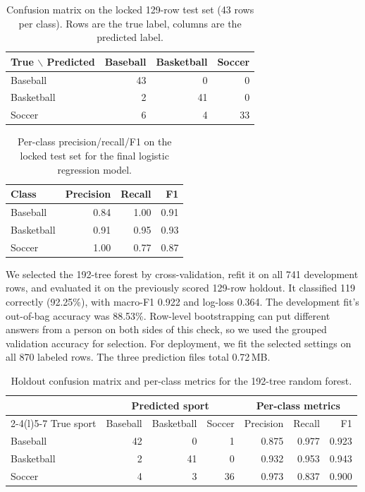 \documentclass[12pt]{article}
\begin{document}
\begin{table}[h]
\centering
\begin{tabular}{@{}lrrr@{}}
\toprule
True $\backslash$ Predicted & Baseball & Basketball & Soccer \\
\midrule
Baseball & 43 & 0 & 0 \\
Basketball & 2 & 41 & 0 \\
Soccer & 6 & 4 & 33 \\
\bottomrule
\end{tabular}
\caption{Confusion matrix on the locked 129-row test set (43 rows per class). Rows are the true
label, columns are the predicted label.}
\label{tab:confusion}
\end{table}

\begin{table}[h]
\centering
\begin{tabular}{@{}lrrr@{}}
\toprule
Class & Precision & Recall & F1 \\
\midrule
Baseball & 0.84 & 1.00 & 0.91 \\
Basketball & 0.91 & 0.95 & 0.93 \\
Soccer & 1.00 & 0.77 & 0.87 \\
\bottomrule
\end{tabular}
\caption{Per-class precision/recall/F1 on the locked test set for the final logistic regression
model.}
\label{tab:perclass}
\end{table}

We selected the 192-tree forest by cross-validation, refit it on all 741 development rows,
and evaluated it on the previously scored 129-row holdout. It classified 119 correctly
(92.25\%), with macro-F1 0.922 and log-loss 0.364. The development fit's out-of-bag accuracy
was 88.53\%. Row-level bootstrapping can put different answers from a person on both sides
of this check, so we used the grouped validation accuracy for selection. For deployment, we
fit the selected settings on all 870 labeled rows. The three prediction files total 0.72\,MB.

\begin{table}[ht]
\centering
\small
\begin{tabular}{@{}lrrrrrr@{}}
\toprule
 & \multicolumn{3}{c}{Predicted sport} & \multicolumn{3}{c}{Per-class metrics} \\
\cmidrule(lr){2-4}\cmidrule(l){5-7}
True sport & Baseball & Basketball & Soccer & Precision & Recall & F1 \\
\midrule
Baseball & 42 & 0 & 1 & 0.875 & 0.977 & 0.923 \\
Basketball & 2 & 41 & 0 & 0.932 & 0.953 & 0.943 \\
Soccer & 4 & 3 & 36 & 0.973 & 0.837 & 0.900 \\
\bottomrule
\end{tabular}
\caption{Holdout confusion matrix and per-class metrics for the 192-tree random forest.}
\label{tab:forest-confusion}
\end{table}
\end{document}
